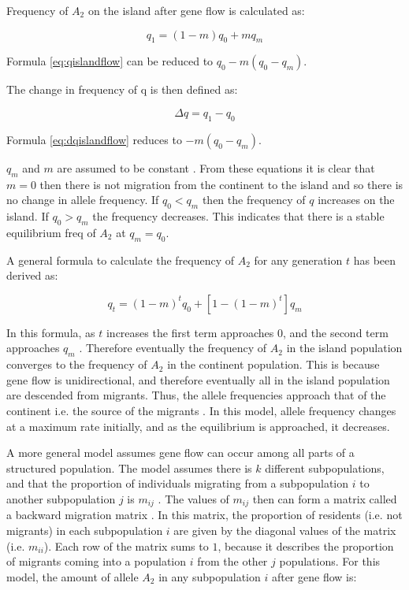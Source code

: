 Frequency of $A_2$ on the island after gene flow is calculated as:

\begin{equation} \label{eq:qislandflow}
q_1 = (1 - m)q_0+mq_m
\end{equation}

Formula \ref{eq:qislandflow} can be reduced to $q_0-m(q_0-q_m)$.

The change in frequency of q is then defined as:

\begin{equation} \label{eq:dqislandflow}
\Delta q = q_1 - q_0
\end{equation}

Formula \ref{eq:dqislandflow} reduces to $- m(q_0-q_m)$.

$q_m$ and $m$ are assumed to be constant \parencite{Hedrick2010}.
From these equations it is clear that $m=0$ then there is not migration from the continent to the island and so there is no change in allele frequency.
If $q_0 < q_m$ then the frequency of $q$ increases on the island.
If $q_0 > q_m$ the frequency decreases.
This indicates that there is a stable equilibrium freq of $A_2$ at $q_m = q_0$.

A general formula to calculate the frequency of $A_2$ for any generation $t$ has been derived as:

\begin{equation}
q_t=(1-m)^tq_0+[1-(1-m)^t]q_m
\end{equation}

In this formula, as $t$ increases the first term approaches $0$, and the second term approaches $q_m$ \parencite{Hedrick2010}.
Therefore eventually the frequency of $A_2$ in the island population converges to the frequency of $A_2$ in the continent population.
This is because gene flow is unidirectional, and therefore eventually all in the island population are descended from migrants.
Thus, the allele frequencies approach that of the continent i.e. the source of the migrants \parencite{Charlesworth2010}.
In this model, allele frequency changes at a maximum rate initially, and as the equilibrium is approached, it decreases.

A more general model assumes gene flow can occur among all parts of a structured population.
The model assumes there is $k$ different subpopulations, and that the proportion of individuals migrating from a subpopulation $i$ to another subpopulation $j$ is $m_{ij}$ \parencite{Hedrick2010}.
The values of $m_{ij}$ then can form a matrix called a backward migration matrix \parencite{Bodmer1968}.
In this matrix, the proportion of residents (i.e. not migrants) in each subpopulation $i$ are given by the diagonal values of the matrix (i.e. $m_{ii}$).
Each row of the matrix sums to $1$, because it describes the proportion of migrants coming into a population $i$ from the other $j$ populations.
For this model, the amount of allele $A_2$ in any subpopulation $i$ after gene flow is:

